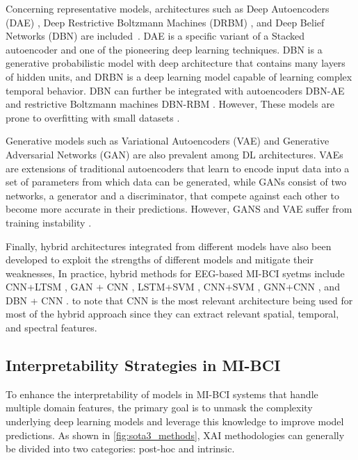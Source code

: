 Concerning representative models, architectures such as Deep Autoencoders (DAE) \cite{tabar2016novel}, Deep Restrictive Boltzmann Machines (DRBM) \cite{zhang2021survey}, and Deep Belief Networks (DBN) are included~\cite{zhang2021combination}. DAE is a specific variant of a Stacked autoencoder and one of the pioneering deep learning techniques. DBN is a generative probabilistic model with deep architecture that contains many layers of hidden units, and DRBN is a deep learning model capable of learning complex temporal behavior. DBN can further be integrated with autoencoders DBN-AE \cite{hassanpour2019novel} and restrictive Boltzmann machines DBN-RBM \cite{xu2020recognition}. However, These models are prone to overfitting with small datasets \cite{kondratyev2020data}.

Generative models such as Variational Autoencoders (VAE) \cite{dai2019eeg} and Generative Adversarial Networks (GAN) \cite{fahimi2020generative} are also prevalent among DL architectures. VAEs are extensions of traditional autoencoders that learn to encode input data into a set of parameters from which data can be generated, while GANs consist of two networks, a generator and a discriminator, that compete against each other to become more accurate in their predictions. However, GANS and VAE suffer from training instability \cite{yang20214}.

Finally, hybrid architectures integrated from different models have also been developed to exploit the strengths of different models and mitigate their weaknesses, In practice, hybrid methods for EEG-based MI-BCI syetms include CNN+LTSM \cite{zhang2021hybrid}, GAN + CNN \cite{zhang2020data}, LSTM+SVM \cite{kumar2021opticalb}, CNN+SVM \cite{alazrai2019deep}, GNN+CNN \cite{tang2023graph}, and DBN + CNN \cite{dai2019eeg}. to note that CNN is the most relevant architecture being used for most of the hybrid approach since they can extract relevant spatial, temporal, and spectral features.


\subsection{Interpretability Strategies in MI-BCI \label{sec:sota3}}

To enhance the interpretability of models in MI-BCI systems that handle multiple domain features, the primary goal is to unmask the complexity underlying deep learning models and leverage this knowledge to improve model predictions. As shown in \cref{fig:sota3_methods}, XAI methodologies can generally be divided into two categories: post-hoc and intrinsic. 

